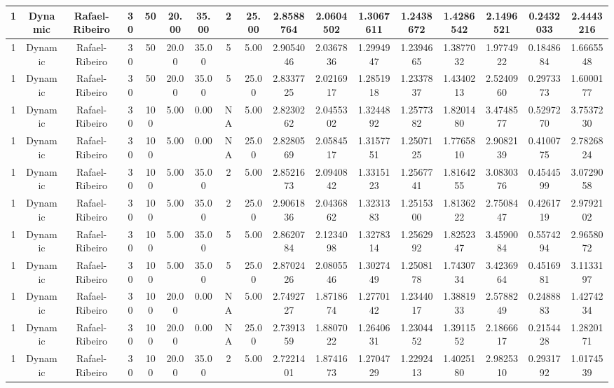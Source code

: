 \documentclass[a4paper]{article}
\begin{document}
\begin{center}
\begin{tabular}{ | c | c | c | c | c | c | c | c | c | c | c | c | c | c | c | c | c | }
		\hline
		1	&	Dynamic	&	Rafael-Ribeiro	&	30	&	50	&	20.00	&	35.00	&	2	&	25.00	&	2.8588764	&	2.0604502	&	1.3067611	&	1.2438672	&	1.4286542	&	2.1496521	&	0.2432033	&	2.4443216 \\
		\hline
		1	&	Dynamic	&	Rafael-Ribeiro	&	30	&	50	&	20.00	&	35.00	&	5	&	5.00	&	2.9054046	&	2.0367836	&	1.2994947	&	1.2394665	&	1.3877032	&	1.9774922	&	0.1848684	&	1.6665548 \\
		\hline
		1	&	Dynamic	&	Rafael-Ribeiro	&	30	&	50	&	20.00	&	35.00	&	5	&	25.00	&	2.8337725	&	2.0216917	&	1.2851918	&	1.2337837	&	1.4340213	&	2.5240960	&	0.2973373	&	1.6000177 \\
		\hline
		1	&	Dynamic	&	Rafael-Ribeiro	&	30	&	100	&	5.00	&	0.00	&	NA	&	5.00	&	2.8230262	&	2.0455302	&	1.3244892	&	1.2577382	&	1.8201480	&	3.4748577	&	0.5297270	&	3.7537230 \\
		\hline
		1	&	Dynamic	&	Rafael-Ribeiro	&	30	&	100	&	5.00	&	0.00	&	NA	&	25.00	&	2.8280569	&	2.0584517	&	1.3157751	&	1.2507125	&	1.7765810	&	2.9082139	&	0.4100775	&	2.7826824 \\
		\hline
		1	&	Dynamic	&	Rafael-Ribeiro	&	30	&	100	&	5.00	&	35.00	&	2	&	5.00	&	2.8521673	&	2.0940842	&	1.3315123	&	1.2567741	&	1.8164255	&	3.0830376	&	0.4544599	&	3.0729058 \\
		\hline
		1	&	Dynamic	&	Rafael-Ribeiro	&	30	&	100	&	5.00	&	35.00	&	2	&	25.00	&	2.9061836	&	2.0436862	&	1.3231383	&	1.2515300	&	1.8136222	&	2.7508447	&	0.4261719	&	2.9792102 \\
		\hline
		1	&	Dynamic	&	Rafael-Ribeiro	&	30	&	100	&	5.00	&	35.00	&	5	&	5.00	&	2.8620784	&	2.1234098	&	1.3278314	&	1.2562992	&	1.8252347	&	3.4590084	&	0.5574294	&	2.9658072 \\
		\hline
		1	&	Dynamic	&	Rafael-Ribeiro	&	30	&	100	&	5.00	&	35.00	&	5	&	25.00	&	2.8702426	&	2.0805546	&	1.3027449	&	1.2508178	&	1.7430734	&	3.4236964	&	0.4516981	&	3.1133197 \\
		\hline
		1	&	Dynamic	&	Rafael-Ribeiro	&	30	&	100	&	20.00	&	0.00	&	NA	&	5.00	&	2.7492727	&	1.8718674	&	1.2770142	&	1.2344017	&	1.3881933	&	2.5788249	&	0.2488883	&	1.4274234 \\
		\hline
		1	&	Dynamic	&	Rafael-Ribeiro	&	30	&	100	&	20.00	&	0.00	&	NA	&	25.00	&	2.7391359	&	1.8807022	&	1.2640631	&	1.2304452	&	1.3911552	&	2.1866617	&	0.2154428	&	1.2820171 \\
		\hline
		1	&	Dynamic	&	Rafael-Ribeiro	&	30	&	100	&	20.00	&	35.00	&	2	&	5.00	&	2.7221401	&	1.8741673	&	1.2704729	&	1.2292413	&	1.4025180	&	2.9825310	&	0.2931792	&	1.0174539 \\

\end{tabular}
\end{center}
\end{document}
